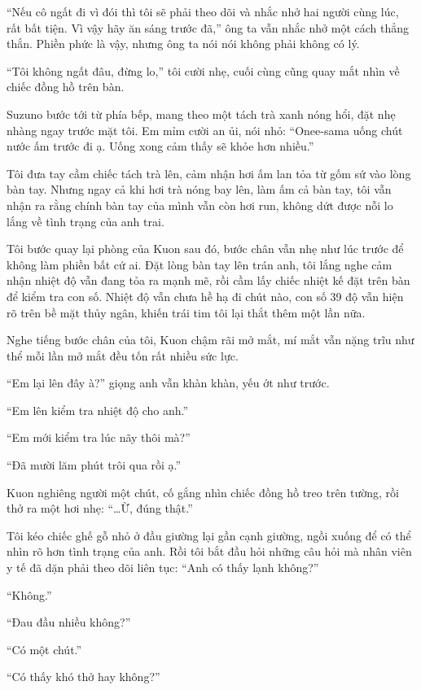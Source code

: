 \documentclass[../main.tex]{subfiles}
\begin{document}
``Nếu cô ngất đi vì đói thì tôi sẽ phải theo dõi và nhắc nhở hai người cùng lúc, rất bất tiện. Vì vậy hãy ăn sáng trước đã,'' ông ta vẫn nhắc nhở một cách thẳng thắn. Phiền phức là vậy, nhưng ông ta nói nói không phải không có lý.

``Tôi không ngất đâu, đừng lo,'' tôi cười nhẹ, cuối cùng cũng quay mắt nhìn về chiếc đồng hồ trên bàn.

Suzuno bước tới từ phía bếp, mang theo một tách trà xanh nóng hổi, đặt nhẹ nhàng ngay trước mặt tôi. Em mỉm cười an ủi, nói nhỏ: ``Onee-sama uống chút nước ấm trước đi ạ. Uống xong cảm thấy sẽ khỏe hơn nhiều.''

Tôi đưa tay cầm chiếc tách trà lên, cảm nhận hơi ấm lan tỏa từ gốm sứ vào lòng bàn tay. Nhưng ngay cả khi hơi trà nóng bay lên, làm ấm cả bàn tay, tôi vẫn nhận ra rằng chính bàn tay của mình vẫn còn hơi run, không dứt được nỗi lo lắng về tình trạng của anh trai.

\ct

Tôi bước quay lại phòng của Kuon sau đó, bước chân vẫn nhẹ như lúc trước để không làm phiền bất cứ ai. Đặt lòng bàn tay lên trán anh, tôi lắng nghe cảm nhận nhiệt độ vẫn đang tỏa ra mạnh mẽ, rồi cầm lấy chiếc nhiệt kế đặt trên bàn để kiểm tra con số. Nhiệt độ vẫn chưa hề hạ đi chút nào, con số 39 độ vẫn hiện rõ trên bề mặt thủy ngân, khiến trái tim tôi lại thắt thêm một lần nữa.

Nghe tiếng bước chân của tôi, Kuon chậm rãi mở mắt, mí mắt vẫn nặng trĩu như thể mỗi lần mở mắt đều tốn rất nhiều sức lực.

``Em lại lên đây à?'' giọng anh vẫn khàn khàn, yếu ớt như trước.

``Em lên kiểm tra nhiệt độ cho anh.''

``Em mới kiểm tra lúc nãy thôi mà?''

``Đã mười lăm phút trôi qua rồi ạ.''

Kuon nghiêng người một chút, cố gắng nhìn chiếc đồng hồ treo trên tường, rồi thở ra một hơi nhẹ: ``\dots Ừ, đúng thật.''

Tôi kéo chiếc ghế gỗ nhỏ ở đầu giường lại gần cạnh giường, ngồi xuống để có thể nhìn rõ hơn tình trạng của anh. Rồi tôi bắt đầu hỏi những câu hỏi mà nhân viên y tế đã dặn phải theo dõi liên tục: ``Anh có thấy lạnh không?''

``Không.''

``Đau đầu nhiều không?''

``Có một chút.''

``Có thấy khó thở hay không?''
\end{document}
